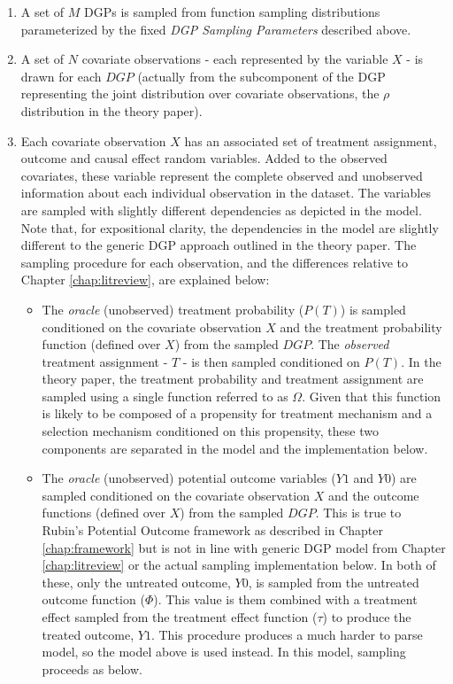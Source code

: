 \documentclass[../main.tex]{subfiles}
\begin{document}
\begin{enumerate}

\item A set of $M$ DGPs is sampled from function sampling distributions parameterized by the fixed \textit{DGP Sampling Parameters} described above.

\item A set of $N$ covariate observations - each represented by the variable $X$ - is drawn for each $DGP$ (actually from the subcomponent of the DGP representing the joint distribution over covariate observations, the $\rho$ distribution in the theory paper).

\item Each covariate observation $X$ has an associated set of treatment assignment, outcome and causal effect random variables. Added to the observed covariates, these variable represent the complete observed and unobserved information about each individual observation in the dataset. The variables are sampled with slightly different dependencies as depicted in the model. Note that, for expositional clarity, the dependencies in the model are slightly different to the generic DGP approach outlined in the theory paper. The sampling procedure for each observation, and the differences relative to Chapter \ref{chap:litreview}, are explained below:

\begin{itemize}
    \item The \textit{oracle} (unobserved) treatment probability ($P(T)$) is sampled conditioned on the covariate observation $X$ and the treatment probability function (defined over $X$) from the sampled $DGP$. The \textit{observed} treatment assignment - $T$ - is then sampled conditioned on $P(T)$. In the theory paper, the treatment probability and treatment assignment are sampled using a single function referred to as $\Omega$. Given that this function is likely to be composed of a propensity for treatment mechanism and a selection mechanism conditioned on this propensity, these two components are separated in the model and the implementation below.
    
    \item The \textit{oracle} (unobserved) potential outcome variables ($Y1$ and $Y0$) are sampled conditioned on the covariate observation $X$ and the outcome functions (defined over $X$) from the sampled $DGP$. This is true to Rubin's Potential Outcome framework as described in Chapter \ref{chap:framework} but is not in line with generic DGP model from Chapter \ref{chap:litreview} or the actual sampling implementation below. In both of these, only the untreated outcome, $Y0$, is sampled from the untreated outcome function ($\Phi$). This  value is them combined with a treatment effect sampled from the treatment effect function ($\tau$) to produce the treated outcome, $Y1$. This procedure produces a much harder to parse model, so the model above is used instead. In this model, sampling proceeds as below.
    

\end{itemize}
\end{enumerate}
\end{document}
